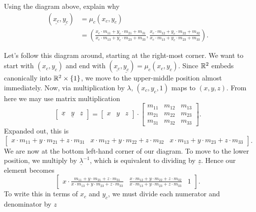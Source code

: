 \documentclass{ximera}
\begin{document}
\begin{problem}
  Using the diagram above, explain why
  \begin{align*}
(\underline{x_{c}},\underline{y_{c}})  &= \mu_{c}(x_{c},y_{c}) \\
    & =\left(
    \frac{x_c\cdot m_{11} + y_c\cdot m_{21} + m_{31}}{x_c\cdot m_{13} + y_c\cdot m_{23} + m_{33}},
    \frac{x_c\cdot m_{12} + y_c\cdot m_{22} + m_{32}}{x_c\cdot m_{13} + y_c\cdot m_{23} + m_{33}}
    \right).
  \end{align*}
  \begin{freeResponse}
    Let's follow this diagram around, starting at the right-most
    corner. We want to start with $(x_c,y_c)$ and end with
    $(\underline{x_c},\underline{y_c}) = \mu_c(x_c,y_c)$. Since $\mathbb R^2$
    embeds canonically into $\mathbb R^2\times\{1\}$, we move to the
    upper-middle position almost immediately. Now, via multiplication
    by $\lambda$, $(x_c,y_c,1)$ maps to $(x,y,z)$. From here we may use
    matrix multiplication
    \[
    \begin{bmatrix}
      \underline{x} & \underline{y} & \underline{z}
    \end{bmatrix}
    =
    \begin{bmatrix}
    x & y & z
    \end{bmatrix}
    \cdot\begin{bmatrix}
    m_{11} & m_{12} & m_{13}\\
    m_{21} & m_{22} & m_{23}\\
    m_{31} & m_{32} & m_{33}
    \end{bmatrix}.
    \]
    Expanded out, this is
    \[
    \begin{bmatrix}
      x\cdot m_{11}+y\cdot m_{21}+z\cdot m_{31} & x\cdot m_{12}+y\cdot m_{22}+z\cdot m_{32} & 
      x\cdot m_{13}+y\cdot m_{23}+z\cdot m_{33}
    \end{bmatrix}.
    \]
    We are now at the bottom left-hand corner of our diagram. To move
    to the lower position, we multiply by $\underline{\lambda}^{-1}$, which
    is equivalent to dividing by $\underline{z}$. Hence our element
    becomes
     \[
    \begin{bmatrix}
      x\cdot \frac{m_{11}+y\cdot m_{21}+z\cdot m_{31}}{x\cdot m_{13}+y\cdot m_{23}+z\cdot m_{33}} &
      \frac{x\cdot m_{12}+y\cdot m_{22}+z\cdot m_{32}}{x\cdot m_{13}+y\cdot m_{23}+z\cdot m_{33}} & 1
    \end{bmatrix}.
    \]
    To write this in terms of $x_c$ and $y_c$, we must divide each
    numerator and denominator by $z$

\end{freeResponse}
\end{problem}
\end{document}

